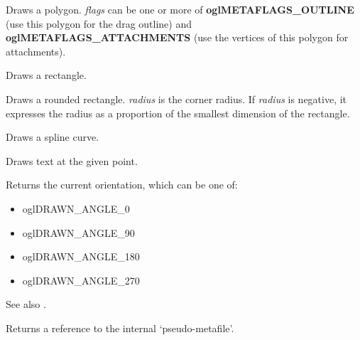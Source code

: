 Draws a polygon. {\it flags} can be one or more of {\bf oglMETAFLAGS\_OUTLINE} (use this polygon for the drag outline)
and {\bf oglMETAFLAGS\_ATTACHMENTS} (use the vertices of this polygon for attachments).

\label{wxdrawnshapedrawrectangle}


Draws a rectangle.

\label{wxdrawnshapedrawroundedrectangle}


Draws a rounded rectangle. {\it radius} is the corner radius. If {\it radius} is negative,
it expresses the radius as a proportion of the smallest dimension of the rectangle.

\label{wxdrawnshapedrawspline}


Draws a spline curve.

\label{wxdrawnshapedrawtext}


Draws text at the given point.

\label{wxdrawnshapegetangle}


Returns the current orientation, which can be one of:

\begin{itemize}\itemsep=0pt
\item oglDRAWN\_ANGLE_0
\item oglDRAWN\_ANGLE_90
\item oglDRAWN\_ANGLE_180
\item oglDRAWN\_ANGLE_270
\end{itemize}

See also .



Returns a reference to the internal `pseudo-metafile'.

